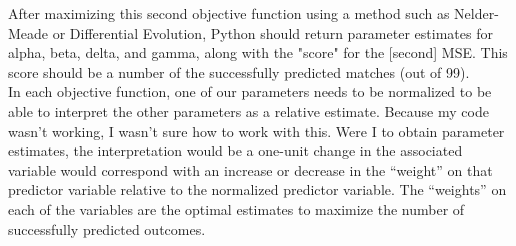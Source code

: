 \documentclass[a4paper,12pt]{article}
\begin{document}
\noindent After maximizing this second objective function using a method such as Nelder-Meade or Differential Evolution, Python should return parameter estimates for alpha, beta, delta, and gamma, along with the "score" for the [second] MSE. This score should be a number of the successfully predicted matches (out of 99). \\

\noindent In each objective function, one of our parameters needs to be normalized to be able to interpret the other parameters as a relative estimate. Because my code wasn't working, I wasn't sure how to work with this. Were I to obtain parameter estimates, the interpretation would be a one-unit change in the associated variable would correspond with an increase or decrease in the \enquote{weight} on that predictor variable relative to the normalized predictor variable. The \enquote{weights} on each of the variables are the optimal estimates to maximize the number of successfully predicted outcomes.   
\end{document}
